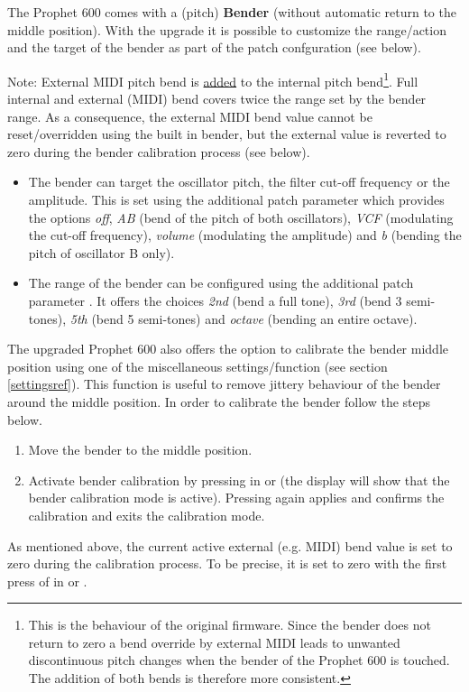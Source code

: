 The Prophet 600 comes with a (pitch) \textbf{Bender} (without automatic return to the middle position). With the upgrade it is possible to customize the range/action and the target of the bender as part of the patch confguration (see below). 

Note: External MIDI pitch bend is \underline{added} to the internal pitch bend\footnote{This is the behaviour of the original firmware. Since the bender does not return to zero a bend override by external MIDI leads to unwanted discontinuous pitch changes when the bender of the Prophet 600 is touched. The addition of both bends is therefore more consistent.}. Full internal and external (MIDI) bend covers twice the range set by the bender range. As a consequence, the external MIDI bend value cannot be reset/overridden using the built in bender, but the external value is reverted to zero during the bender calibration process (see below).

\begin{itemize}
  \item The bender can target the oscillator pitch, the filter cut-off frequency or the amplitude. This is set using the additional patch parameter \bentarget which provides the options \textit{off}, \textit{AB} (bend of the pitch of both oscillators), \textit{VCF} (modulating the cut-off frequency), \textit{volume} (modulating the amplitude) and \textit{b} (bending the pitch of oscillator B only).
  \item The range of the bender can be configured using the additional patch parameter \bendrange. It offers the choices \textit{2nd} (bend a full tone), \textit{3rd} (bend 3 semi-tones), \textit{5th} (bend 5 semi-tones) and \textit{octave} (bending an entire octave).
\end{itemize}

The upgraded Prophet 600 also offers the option to calibrate the bender middle position using one of the miscellaneous settings/function (see section \ref{settingsref}). This function is useful to remove jittery behaviour of the bender around the middle position. In order to calibrate the bender follow the steps below.

\begin{enumerate}
  \item Move the bender to the middle position.  
  \item Activate bender calibration by pressing  in \shiftmode or \shiftlock (the display will show that the bender calibration mode is active). Pressing  again applies and confirms the calibration and exits the calibration mode.
\end{enumerate}

As mentioned above, the current active external (e.g. MIDI) bend value is set to zero during the calibration process. To be precise, it is set to zero with the first press of  in \shiftmode or \shiftlock.

